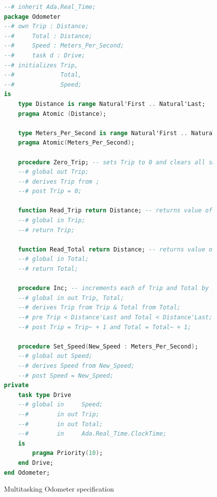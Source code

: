 \begin{figure}%
\singlespacing
\begin{lstlisting}[language=ada, frame=single, gobble=0]
--# inherit Ada.Real_Time;
package Odometer
--# own Trip : Distance;
--#     Total : Distance;
--#     Speed : Meters_Per_Second;
--#     task d : Drive;
--# initializes Trip, 
--#             Total,
--#             Speed;
is
    type Distance is range Natural'First .. Natural'Last;
    pragma Atomic (Distance);
    
    type Meters_Per_Second is range Natural'First .. Natural'Last;
    pragma Atomic(Meters_Per_Second);
    
    procedure Zero_Trip; -- sets Trip to 0 and clears all saved Trip marks.
    --# global out Trip;
    --# derives Trip from ;
    --# post Trip = 0;
    
    function Read_Trip return Distance; -- returns value of Trip.
    --# global in Trip;
    --# return Trip;
    
    function Read_Total return Distance; -- returns value of Total
    --# global in Total;
    --# return Total;
    
    procedure Inc; -- increments each of Trip and Total by 1.
    --# global in out Trip, Total;
    --# derives Trip from Trip & Total from Total;
    --# pre Trip < Distance'Last and Total < Distance'Last;
    --# post Trip = Trip~ + 1 and Total = Total~ + 1;

    procedure Set_Speed(New_Speed : Meters_Per_Second);
    --# global out Speed;
    --# derives Speed from New_Speed;
    --# post Speed = New_Speed;                             
private    	    
    task type Drive
    --# global in     Speed;
    --#        in out Trip;
    --#        in out Total;
    --#        in     Ada.Real_Time.ClockTime;
    is
        pragma Priority(10);
    end Drive;	    
end Odometer;
\end{lstlisting} 
\doublespacing
\caption{Multitasking Odometer specification}
\label{listing:Odometer2005Tasking_spec}
\end{figure}


